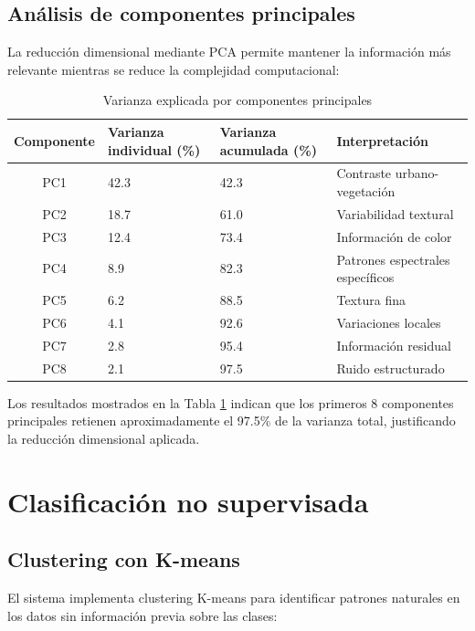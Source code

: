 \subsection{Análisis de componentes principales}

La reducción dimensional mediante PCA permite mantener la información más relevante mientras se reduce la complejidad computacional:

\begin{table}[h]
\centering
\caption{Varianza explicada por componentes principales}
\renewcommand{\arraystretch}{1.2}
\begin{tabular}{@{}cp{2.2cm}p{2.2cm}p{4cm}@{}}
\toprule
\textbf{Componente} & \textbf{Varianza individual (\%)} & \textbf{Varianza acumulada (\%)} & \textbf{Interpretación} \\
\midrule
PC1 & 42.3 & 42.3 & Contraste urbano-vegetación \\
PC2 & 18.7 & 61.0 & Variabilidad textural \\
PC3 & 12.4 & 73.4 & Información de color \\
PC4 & 8.9 & 82.3 & Patrones espectrales específicos \\
PC5 & 6.2 & 88.5 & Textura fina \\
PC6 & 4.1 & 92.6 & Variaciones locales \\
PC7 & 2.8 & 95.4 & Información residual \\
PC8 & 2.1 & 97.5 & Ruido estructurado \\
\bottomrule
\end{tabular}
\label{tab:pca_variance}
\end{table}

Los resultados mostrados en la Tabla \ref{tab:pca_variance} indican que los primeros 8 componentes principales retienen aproximadamente el 97.5\% de la varianza total, justificando la reducción dimensional aplicada.

\section{Clasificación no supervisada}

\subsection{Clustering con K-means}

El sistema implementa clustering K-means para identificar patrones naturales en los datos sin información previa sobre las clases:

